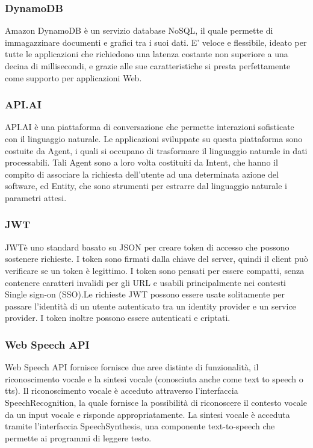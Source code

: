 \subsubsection{DynamoDB}
Amazon DynamoDB è un servizio database NoSQL, il quale permette di immagazzinare documenti e grafici tra i suoi dati. E' veloce e flessibile, ideato per tutte le applicazioni che richiedono una latenza costante non superiore a una decina di millisecondi, e grazie alle sue caratteristiche si presta perfettamente come supporto per applicazioni Web.

\subsubsection{API.AI}
API.AI è una piattaforma di conversazione che permette interazioni sofisticate con il linguaggio naturale.
Le applicazioni sviluppate su questa piattaforma sono costuite da Agent, i quali si occupano di trasformare il linguaggio naturale in dati processabili. Tali Agent sono a loro volta costituiti da Intent, che hanno il compito di associare la richiesta dell'utente ad una determinata azione del software, ed Entity, che sono strumenti per estrarre dal linguaggio naturale i parametri attesi.

\subsubsection{JWT}
JWTè uno standard basato su JSON per creare token di accesso che possono sostenere richieste. I token sono firmati dalla chiave del server, quindi il client può verificare se un token è legittimo. I token sono pensati per essere compatti, senza contenere caratteri invalidi per gli URL e usabili principalmente nei contesti Single sign-on (SSO).Le richieste JWT possono essere usate solitamente per passare l'identità di un utente autenticato tra un identity provider e un service provider. I token inoltre possono essere autenticati e criptati.

\subsubsection{Web Speech API}
Web Speech API fornisce fornisce due aree distinte di funzionalità, il riconoscimento vocale e la sintesi vocale (conosciuta anche come text to speech o tts).
Il riconoscimento vocale è acceduto attraverso l'interfaccia SpeechRecognition, la quale fornisce la possibilità di riconoscere il contesto vocale da un input vocale e risponde appropriatamente. 
La sintesi vocale è acceduta tramite l'interfaccia SpeechSynthesis, una componente text-to-speech che permette ai programmi di leggere testo.

